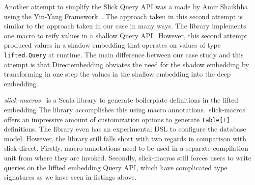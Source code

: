 Another attempt to simplify the Slick Query API was a made by Amir Shaikhha~\autocite{shaikhha_embedded_2014} using the Yin-Yang Framework~\autocite{jovanovic_yin-yang:_2014}.
The approach taken in this second attempt is similar to the approach taken in our case in many ways.
The library implements one macro to reify values in a shallow Query API.\
However, this second attempt produced values in a shadow embedding that operates on values of type \texttt{lifted.Query} at runtime.
The main difference between our case study and this attempt is that Directembedding obviates the need for the shadow embedding by transforming in one step the values in the shallow embedding into the deep embedding.

\emph{slick-macros}~\autocite{ebiznext_slick-macros_2014} is a Scala library to generate boilerplate definitions in the lifted embedding
The library accomplishes this using macro annotations.\
slick-macros offers an impressive amount of customization options to generate \texttt{Table[T]} definitions.
The library even has an experimental DSL to configure the database model.
However, the library still falls short with two regards in comparison with slick-direct.
Firstly, macro annotations need to be used in a separate compilation unit from where they are invoked.
Secondly, slick-macros still forces users to write queries on the liffted embedding Query API, which have complicated type signatures as we have seen in listings above.






